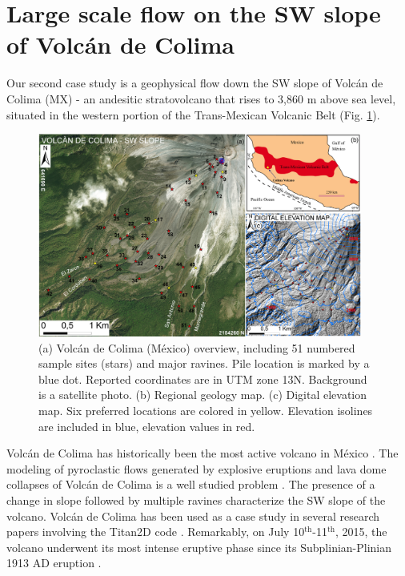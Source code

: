 \documentclass{article}
\begin{document}
\section{Large scale flow on the SW slope of Volc{\'a}n de Colima}\label{QoI2}
Our second case study is a geophysical flow down the SW slope of Volc{\'a}n de Colima (MX) - an andesitic stratovolcano that rises to 3,860 m above sea level, situated in the western portion of the Trans-Mexican Volcanic Belt (Fig. \ref{fig:Colima-first}).
\begin{figure}[H]
    \includegraphics[width=0.95\textwidth]{BAF_VolcanDeColima/ColimaFig.jpg}
    \centering
    \caption{(a) Volc{\'a}n de Colima (M{\'e}xico) overview, including 51 numbered sample sites (stars) and major ravines. Pile location is marked by a blue dot. Reported coordinates are in UTM zone 13N. Background is a satellite photo. (b) Regional geology map. (c) Digital elevation map. Six preferred locations are colored in yellow. Elevation isolines are included in blue, elevation values in red.}
    \label{fig:Colima-first}
\end{figure}
Volc{\'a}n de Colima has historically been the most active volcano in M{\'e}xico \citep{DeLaCruzReina1993, Zobin2002, Gonzalez2002}. The modeling of pyroclastic flows generated by explosive eruptions and lava dome collapses of Volc{\'a}n de Colima is a well studied problem \citep{DelPozzo1995,Sheridan1995,Saucedo2002,Saucedo2004,Saucedo2005,Sarocchi2011,Capra2015}. The presence of a change in slope followed by multiple ravines characterize the SW slope of the volcano. Volc{\'a}n de Colima has been used as a case study in several research papers involving the Titan2D code \citep{Rupp2004, Rupp2006, Dalbey2008, Yu2009, Sulpizio2010, Capra2011, Aghakhani2016}. Remarkably, on July 10$^{\mathrm{th}}$-11$^{\mathrm{th}}$, 2015, the volcano underwent its most intense eruptive phase since its Subplinian-Plinian 1913 AD eruption \citep{Saucedo2010, Zobin2015, ReyesDaVilla2016, Capra2016, Macorps2017}.
\end{document}
